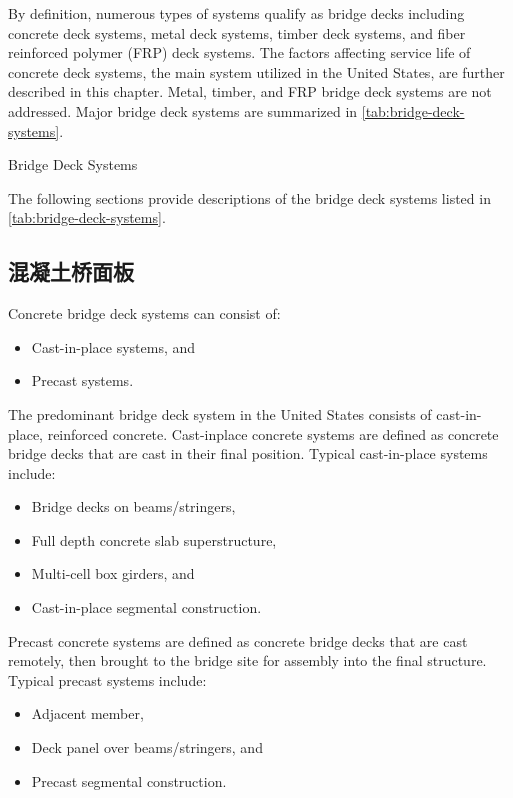By definition, numerous types of systems qualify as bridge decks including concrete deck systems, metal deck systems, timber deck systems, and fiber reinforced polymer (FRP) deck systems. The factors affecting service life of concrete deck systems, the main system utilized in the United States, are further described in this chapter. Metal, timber, and FRP bridge deck systems are not addressed. Major bridge deck systems are summarized in \cref{tab:bridge-deck-systems}.

\begin{table}
  \caption{Bridge Deck Systems}\label{tab:bridge-deck-systems}
  
\end{table}

The following sections provide descriptions of the bridge deck systems listed in \cref{tab:bridge-deck-systems}.

\subsection{混凝土桥面板}
Concrete bridge deck systems can consist of:
\begin{itemize}
  \item Cast-in-place systems, and
  \item Precast systems.
\end{itemize}

The predominant bridge deck system in the United States consists of cast-in-place, reinforced concrete. Cast-inplace concrete systems are defined as concrete bridge decks that are cast in their final position. Typical cast-in-place systems include:

\begin{itemize}
  \item Bridge decks on beams/stringers,
  \item Full depth concrete slab superstructure,
  \item Multi-cell box girders, and
  \item Cast-in-place segmental construction.
\end{itemize}

Precast concrete systems are defined as concrete bridge decks that are cast remotely, then brought to the bridge site for assembly into the final structure. Typical precast systems include:
\begin{itemize}
  \item Adjacent member,
  \item Deck panel over beams/stringers, and
  \item Precast segmental construction.
\end{itemize}

